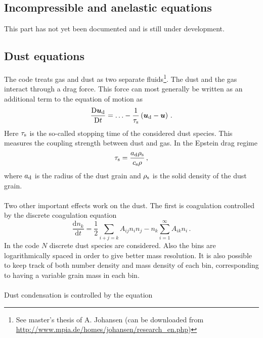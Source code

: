 \documentclass[\mydriver,12pt,twoside,notitlepage,a4paper]{article}
\newcommand{\de}      {\mathrm{d}}
\newcommand{\De}      {\mathrm{D}}
\renewcommand{\vec}[1]{\mbox{\boldmath{$#1$}}}
\begin{document}
\subsection{Incompressible and anelastic equations}

This part has not yet been documented and is still under development.


\subsection{Dust equations}

The code treats gas and dust as two separate fluids\footnote{See master's
thesis of A. Johansen (can be downloaded from\\
\url{http://www.mpia.de/homes/johansen/research_en.php})}. The dust and the gas
interact through a drag force. This force can most generally be written as an
additional term to the equation of motion as
\begin{equation}
  \frac{\De \vec{u}_{\rm d}}{\De t} = \ldots - \frac{1}{\tau_{\rm s}}
  \left( \vec{u}_{\rm d} - \vec{u} \right)  \, .
\end{equation}
Here $\tau_{\rm s}$ is the so-called stopping time of the considered dust
species. This measures the coupling strength between dust and gas. In the
Epstein drag regime
\begin{equation}
  \tau_{\rm s} = \frac{a_{\rm d} \rho_{\rm s}}{c_{\rm s} \rho} \, ,
\end{equation}
where $a_{\rm d}$ is the radius of the dust grain and $\rho_{\rm s}$ is the
solid density of the dust grain.
\\ \\
Two other important effects work on the dust. The first is coagulation
controlled by the discrete coagulation equation
\begin{equation}
  \frac{\de n_k}{\de t} = \frac{1}{2} \sum_{i+j=k} A_{ij} n_i n_j
  - n_k \sum_{i=1}^\infty A_{ik} n_i \, .
\end{equation}
In the code $N$ discrete dust species are considered. Also the bins are
logarithmically spaced in order to give better mass resolution. It is also
possible to keep track of both number density and mass density of each bin,
corresponding to having a variable grain mass in each bin.
\\ \\
Dust condensation is controlled by the equation
\end{document}
